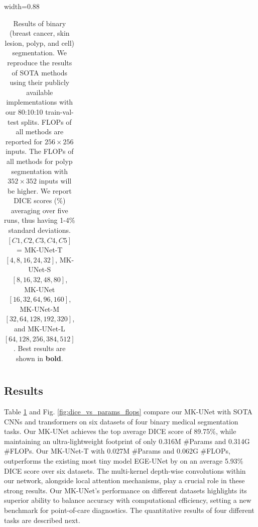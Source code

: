 \begin{table}[t]
\begin{center}
\begin{adjustbox}{width=0.88\textwidth}
\begin{tabular}{l|c|r|r|r|r|r|rr|rr|r}
\bottomrule
\end{tabular}
\end{adjustbox}
\vspace{-0.2cm}
\caption{Results of binary (breast cancer, skin lesion, polyp, and cell) segmentation. We reproduce the results of SOTA methods using their publicly available implementations with our 80:10:10 train-val-test splits. FLOPs of all methods are reported for $256\times256$ inputs. The FLOPs of all methods for polyp segmentation with $352\times352$ inputs will be higher. We report DICE scores (\%) averaging over five runs, thus having 1-4\% standard deviations. $[C1, C2, C3, C4, C5]$ = MK-UNet-T $[4, 8, 16, 24, 32]$, MK-UNet-S $[8, 16, 32, 48, 80]$, MK-UNet $[16, 32, 64, 96, 160]$, MK-UNet-M $[32, 64, 128, 192, 320]$, and MK-UNet-L $[64, 128, 256, 384, 512]$. Best results are shown in \textbf{bold}.}
\label{tab:results_binary_mis}
\end{center}
\vspace{-0.5cm}
\end{table}


\subsection{Results}
\label{ssec:results}
Table \ref{tab:results_binary_mis} and Fig. \ref{fig:dice_vs_params_flops} compare our MK-UNet with SOTA CNNs and transformers on six datasets of four binary medical segmentation tasks. Our MK-UNet achieves the top average DICE score of 89.75\%, while maintaining an ultra-lightweight footprint of only 0.316M \#Params and 0.314G \#FLOPs. Our MK-UNet-T with 0.027M \#Params and 0.062G \#FLOPs, outperforms the existing most tiny model EGE-UNet \cite{ruan2023ege} by on an average 5.93\% DICE score over six datasets. The multi-kernel depth-wise convolutions within our network, alongside local attention mechanisms, play a crucial role in these strong results. Our MK-UNet's performance on different datasets highlights its superior ability to balance accuracy with computational efficiency, setting a new benchmark for point-of-care diagnostics. The quantitative results of four different tasks are described next.

